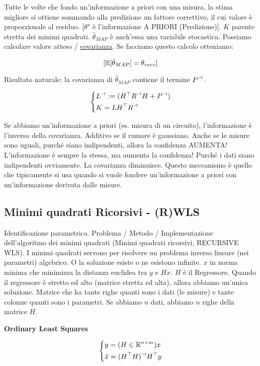 Tutte le volte che fondo un'informazione a priori con una misura, la stima migliore si ottiene sommando alla predizione un fattore correttivo, il cui valore è proporzionale al residuo. [$\theta^\star$ è l'informazione A PRIORI (Predizione)]. $K$ parente stretta dei minimi quadrati. $\hat{\theta}_{MAP}$ è anch'essa una variabile stocastica. Possiamo calcolare valore atteso / \underline{covarianza}. Se facciamo questo calcolo otteniamo:

\[
	[\operatorname{\mathbb{E}}[\hat{\theta}_{MAP}] = \theta_{vero}]
\]

Risultato naturale: la covarianza di $\hat{\theta}_{MAP}$ contiene il termine $\inv{P}$. 

\[
	\left\{
	\begin{aligned}
	&\inv{L} := (H^\top\inv{R}H+\inv{P})\\
	&K = LH^\top\inv{R}
	\end{aligned}
	\right. 
\]

Se abbiamo un'informazione a priori (es. misura di un circuito), l'informazione è l'inversa della covarianza. Additivo se il rumore è gaussiano. Anche se le misure sono uguali, purché siano indipendenti, allora la confidenza AUMENTA! L'informazione è sempre la stessa, ma aumenta la confidenza! Purché i dati siano indipendenti ovviamente. La covarianza diminuisce. Questo meccanismo è quello che tipicamente si usa quando si vuole fondere un'informazione a priori con un'informazione derivata dalle misure.

\subsection{Minimi quadrati Ricorsivi - (R)WLS}

Identificazione parametrica. Problema / Metodo / Implementazione dell'algoritmo dei minimi quadrati (Minimi quadrati ricorsivi, RECURSIVE WLS). I minimi quadrati servono per risolvere un problema inverso lineare (nei parametri) algebrico. O la soluzione esiste o ne esistono infinite. $x$ in norma minima che minimizza la distanza euclidea tra $y$ e $Hx$. $H$ è il Regressore. Quando il regressore è stretto ed alto (matrice stretta ed alta), allora abbiamo un'unica soluzione. Matrice che ha tante righe quanti sono i dati (le misure) e tante colonne quanti sono i parametri. Se abbiamo $n$ dati, abbiamo $n$ righe della matrice $H$.

\begin{defn}{\textbf{Ordinary Least Squares}}

\[
	\left\{
	\begin{aligned}
	&y=(H\in\R^{n\times m})x\\
	&\hat{x}=\inv{(H^\top H)}H^\top y
	\end{aligned}
	\right.
\]

\end{defn}

